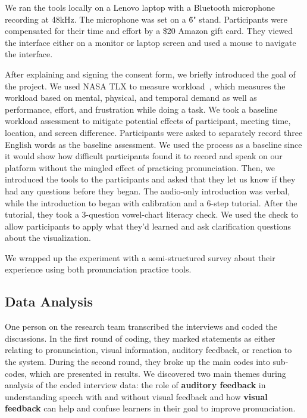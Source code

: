 
We ran the tools locally on a Lenovo laptop with a Bluetooth microphone recording at 48kHz. The microphone was set on a \~6" stand. Participants were compensated for their time and effort by a \$20 Amazon gift card. They viewed the interface either on a monitor or laptop screen and used a mouse to navigate the interface. 

After explaining and signing the consent form, we briefly introduced the goal of the project. We used NASA TLX to measure workload~\cite{hart1986nasa}, which measures the workload based on mental, physical, and temporal demand as well as performance, effort, and frustration while doing a task. We took a baseline workload assessment to mitigate potential effects of participant, meeting time, location, and screen difference. Participants were asked to separately record three English words as the baseline assessment. We used the process as a baseline since it would show how difficult participants found it to record and speak on our platform without the mingled effect of practicing pronunciation.  
Then, we introduced the tools to the participants and asked that they let us know if they had any questions before they began. The audio-only introduction was verbal, while the introduction to \visowel{} began with calibration and a 6-step tutorial. After the tutorial, they took a 3-question vowel-chart literacy check. We used the check to allow participants to apply what they'd learned and ask clarification questions about the visualization.

We wrapped up the experiment with a semi-structured survey about their experience using both pronunciation practice tools.

\subsection{Data Analysis}
One person on the research team transcribed the interviews and coded the discussions. In the first round of coding, they marked statements as either relating to pronunciation, visual information, auditory feedback, or reaction to the system. During the second round, they broke up the main codes into sub-codes, which are presented in results. We discovered two main themes during analysis of the coded interview data: the role of \textbf{auditory feedback} in understanding speech with and without visual feedback and how \textbf{visual feedback} can help and confuse learners in their goal to improve pronunciation. 